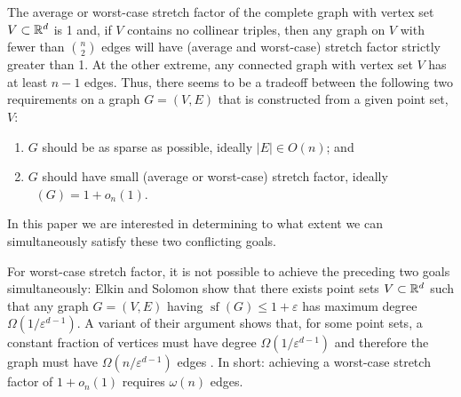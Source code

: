 \documentclass{patmorin}
\DeclareMathOperator{\asf}{asf}
\DeclareMathOperator{\xsf}{(a)sf}
\DeclareMathOperator{\strf}{sf}
\newcommand{\eps}{\varepsilon}
\begin{document}
The average or worst-case stretch factor of the complete graph
with vertex set $V\subset\mathbb{R}^d$ is 1 and, if $V$ contains no
collinear triples, then any graph on $V$ with fewer than $\binom{n}{2}$
edges will have (average and worst-case) stretch factor strictly greater
than 1.  At the other extreme, any connected graph with vertex set $V$
has at least $n-1$ edges.  Thus, there seems to be a tradeoff between
the following two requirements on a graph $G=(V,E)$ that is constructed
from a given point set, $V$:
\begin{enumerate}
  \item $G$ should be as sparse as possible, ideally $|E|\in O(n)$; and

  \item $G$ should have small (average or worst-case) stretch factor,
  ideally $\xsf(G)=1+o_n(1)$.
\end{enumerate}
In this paper we are interested in determining to what extent we can
simultaneously satisfy these two conflicting goals.

For worst-case stretch factor, it is not possible to achieve the preceding
two goals simultaneously: Elkin and Solomon \cite{elkin.solomon:steiner}
show that there exists point sets $V\subset\mathbb{R}^d$ such that any
graph $G=(V,E)$ having $\strf(G)\le 1+\eps$ has maximum degree
$\Omega(1/\eps^{d-1})$.  A variant of their argument shows that,
for some point sets, a constant fraction of vertices must have
degree $\Omega(1/\eps^{d-1})$ and therefore the graph must have
$\Omega(n/\eps^{d-1})$ edges \cite{solomon}. In short: achieving a
worst-case stretch factor of $1+o_n(1)$ requires $\omega(n)$ edges.


\end{document}

